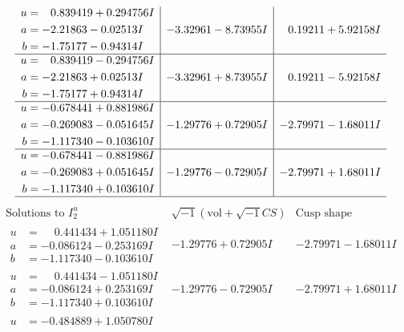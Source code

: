 \documentclass[1p]{elsarticle_modified}
\theoremstyle{definition}
\newcommand{\I}{\sqrt{-1}}
\begin{document}
$$\begin{array}{c|c|c}
\begin{aligned}
u &= \phantom{-}0.839419 + 0.294756 I \\
a &= -2.21863 - 0.02513 I \\
b &= -1.75177 - 0.94314 I\end{aligned}
 & -3.32961 - 8.73955 I & \phantom{-}0.19211 + 5.92158 I \\ \hline\begin{aligned}
u &= \phantom{-}0.839419 - 0.294756 I \\
a &= -2.21863 + 0.02513 I \\
b &= -1.75177 + 0.94314 I\end{aligned}
 & -3.32961 + 8.73955 I & \phantom{-}0.19211 - 5.92158 I \\ \hline\begin{aligned}
u &= -0.678441 + 0.881986 I \\
a &= -0.269083 - 0.051645 I \\
b &= -1.117340 - 0.103610 I\end{aligned}
 & -1.29776 + 0.72905 I & -2.79971 - 1.68011 I \\ \hline\begin{aligned}
u &= -0.678441 - 0.881986 I \\
a &= -0.269083 + 0.051645 I \\
b &= -1.117340 + 0.103610 I\end{aligned}
 & -1.29776 - 0.72905 I & -2.79971 + 1.68011 I\\
 \hline 
 \end{array}$$\newpage$$\begin{array}{c|c|c}  
\text{Solutions to }I^u_{2}& \I (\text{vol} + \sqrt{-1}CS) & \text{Cusp shape}\\
 \hline 
\begin{aligned}
u &= \phantom{-}0.441434 + 1.051180 I \\
a &= -0.086124 - 0.253169 I \\
b &= -1.117340 - 0.103610 I\end{aligned}
 & -1.29776 + 0.72905 I & -2.79971 - 1.68011 I \\ \hline\begin{aligned}
u &= \phantom{-}0.441434 - 1.051180 I \\
a &= -0.086124 + 0.253169 I \\
b &= -1.117340 + 0.103610 I\end{aligned}
 & -1.29776 - 0.72905 I & -2.79971 + 1.68011 I \\ \hline\begin{aligned}
u &= -0.484889 + 1.050780 I \\

\end{aligned}
\end{array}$$
\end{document}
